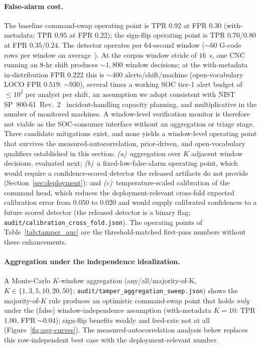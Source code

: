 \documentclass[sensors,article,submit,moreauthors,pdftex]{Definitions/mdpi}
\begin{document}
\paragraph{False-alarm cost.} The baseline command-swap operating point is TPR $0.92$ at FPR $0.30$ (with-metadata: TPR $0.95$ at FPR $0.22$); the sign-flip operating point is TPR $0.70$/$0.80$ at FPR $0.35$/$0.24$. The detector operates per 64-second window ($\sim$60 G-code rows per window on average~\cite{decoder_paper}). At the corpus window stride of $16$~s, one CNC running an 8-hr shift produces $\sim$$1{,}800$ window decisions; at the with-metadata in-distribution FPR $0.222$ this is $\sim$$400$ alerts/shift/machine (open-vocabulary LOCO FPR $0.519$: $\sim$$930$), several times a working SOC tier-1 alert budget of $\le\!10^{2}$ per analyst per shift, an assumption we adopt consistent with NIST SP~800-61~Rev.~2~\cite{nist2012sp80061} incident-handling capacity planning, and multiplicative in the number of monitored machines. A window-level verification monitor is therefore not viable as the SOC-consumer interface without an aggregation or triage stage. Three candidate mitigations exist, and none yields a window-level operating point that survives the measured-autocorrelation, prior-driven, and open-vocabulary qualifiers established in this section: \emph{(a)}~aggregation over $K$ adjacent window decisions, evaluated next; \emph{(b)}~a fixed-low-false-alarm operating point, which would require a confidence-scored detector the released artifacts do not provide (Section~\ref{sec:deployment}); and \emph{(c)}~temperature-scaled calibration of the command head, which reduces the deployment-relevant cross-fold expected calibration error from $0.050$ to $0.020$ and would supply calibrated confidences to a future scored detector (the released detector is a binary flag; \texttt{audit/calibration\_cross\_fold.json}). The operating points of Table~\ref{tab:tamper_auc} are the threshold-matched first-pass numbers without these enhancements.

\paragraph{Aggregation under the independence idealization.} A Monte-Carlo $K$-window aggregation (any/all/majority-of-K, $K\!\in\!\{1,3,5,10,20,50\}$; \texttt{audit/tamper\_aggregation\_sweep.json}) shows the majority-of-$K$ rule produces an optimistic command-swap point that holds \emph{only} under the (false) window-independence assumption (with-metadata $K\!=\!10$: TPR $1.00$, FPR $\sim\!0.04$); sign-flip benefits weakly and feed-rate not at all (Figure~\ref{fig:agg-curves}). The measured-autocorrelation analysis below replaces this row-independent best case with the deployment-relevant number.
\end{document}
